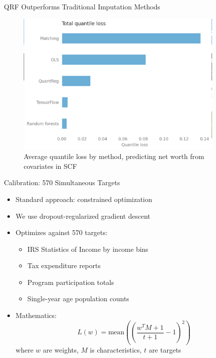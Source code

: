 \documentclass{beamer}
\begin{document}
\begin{frame}{QRF Outperforms Traditional Imputation Methods}
    \begin{figure}
        \centering
        \includegraphics[width=0.9\textwidth, height=0.7\textheight, keepaspectratio]{../../paper/figures/quantile_loss.png}
        \caption{Average quantile loss by method, predicting net worth from covariates in SCF}
    \end{figure}
\end{frame}

\begin{frame}{Calibration: 570 Simultaneous Targets}
    \begin{itemize}
        \item Standard approach: constrained optimization
        \item We use dropout-regularized gradient descent
        \item Optimizes against 570 targets:
        \begin{itemize}
            \item IRS Statistics of Income by income bins
            \item Tax expenditure reports
            \item Program participation totals
            \item Single-year age population counts
        \end{itemize}
        \item Mathematics:
        \[ L(w) = \text{mean}\left(\left(\frac{w^T M + 1}{t + 1} - 1\right)^2\right) \]
        where $w$ are weights, $M$ is characteristics, $t$ are targets
    \end{itemize}
\end{frame}
\end{document}
